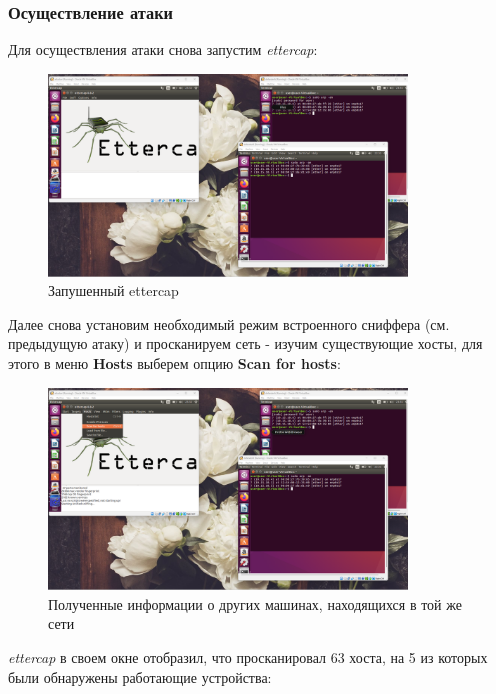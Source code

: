 \documentclass[a4paper]{article}
\begin{document}
  \subsubsection{Осуществление атаки}

  Для осуществления атаки снова запустим \textit{ettercap}:

  \begin{figure}[H]
    \centering
    \includegraphics[width=0.85\textwidth]{02_00 (47)}
    \caption{Запушенный ettercap}
    \label{img:0036}
  \end{figure}

  Далее снова установим необходимый режим встроенного сниффера (см. предыдущую атаку) и просканируем
  сеть - изучим существующие хосты, для этого в меню \textbf{Hosts} выберем опцию \textbf{Scan for hosts}:

  \begin{figure}[H]
    \centering
    \includegraphics[width=0.85\textwidth]{02_00 (50)}
    \caption{Полученные информации о других машинах, находящихся в той же сети}
    \label{img:0037}
  \end{figure}

  \textit{ettercap} в своем окне отобразил, что просканировал 63 хоста, на 5 из которых 
  были обнаружены работающие устройства:
\end{document}
